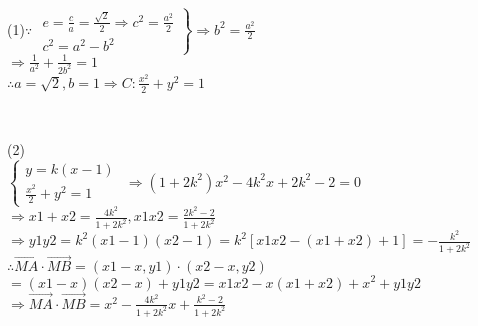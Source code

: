 
\immediate{}
\immediate{}
%
\newcommand{\fTxT}[1]{\text{\zh{#1}}}
%
\begin{minipage}[b][19cm][t]{\textwidth}
\begin{center}\large{}\end{center}
\begin{large}
   \\
\\
\end{large}\\[10pt]
\begin{large}(1)$\because$ $\left.\begin{aligned}
  e=\frac{c}{a}=\frac{\sqrt{2}}{2} \Rightarrow c^2=\frac{a^2}{2}\\
  c^2=a^2-b^2
\end{aligned}\right\} \Longrightarrow b^2=\frac{a^2}{2} $ \\
 $\Rightarrow \frac{1}{a^2}+ \frac{1}{2b^2}=1$ \\
$\therefore a=\sqrt{2},b=1 \Rightarrow C:\frac{x^2}{2}+y^2=1$
\end{large}\\[10pt]
\begin{large}(2)
 \\
$\begin{cases}
  y=k(x-1) \\
  \frac{x^2}{2}+y^2=1
\end{cases}$ $\Rightarrow (1+2k^2)x^2-4k^2x+2k^2-2=0$\\
 $\Rightarrow x1+x2=\frac{4k^2}{1+2k^2},x1x2=\frac{2k^2-2}{1+2k^2}$\\
$\Rightarrow y1y2=k^2(x1-1)(x2-1)=k^2[x1x2-(x1+x2)+1]=-\frac{k^2}{1+2k^2}$\\
$\therefore \vec{MA}\cdot\vec{MB}=(x1-x,y1)\cdot(x2-x,y2)$\\
$=(x1-x)(x2-x)+y1y2=x1x2-x(x1+x2)+x^2+y1y2$\\
$\Rightarrow \vec{MA}\cdot\vec{MB}=x^2-\frac{4k^2}{1+2k^2}x+\frac{k^2-2}{1+2k^2}$\\

\end{large}
\end{minipage}

